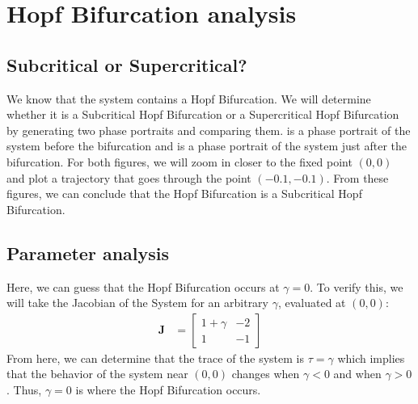 \section{Hopf Bifurcation analysis}\label{sec:hopf-bifurcation-analysis}

\subsection{Subcritical or Supercritical?}\label{subsec:subcritical-or-supercritical?}
We know that the system contains a Hopf Bifurcation. We will determine whether it is a Subcritical Hopf Bifurcation or a Supercritical Hopf Bifurcation by generating two phase portraits and comparing them.  is a phase portrait of the system before the bifurcation and  is a phase portrait of the system just after the bifurcation. For both figures, we will zoom in closer to the fixed point $(0,0)$ and plot a trajectory that goes through the point $(-0.1,-0.1)$. From these figures, we can conclude that the Hopf Bifurcation is a Subcritical Hopf Bifurcation.

\subsection{Parameter analysis}\label{subsec:parameter-analysis}
Here, we can guess that the Hopf Bifurcation occurs at $\gamma=0$. To verify this, we will take the Jacobian of the System for an arbitrary $\gamma$, evaluated at $(0,0)$:
\begin{align*}
    \textbf{J} &= \begin{bmatrix}
        1+\gamma & -2\\
        1 & -1
    \end{bmatrix}
\end{align*}
From here, we can determine that the trace of the system is $\tau=\gamma$ which implies that the behavior of the system near $(0,0)$ changes when $\gamma<0$ and when $\gamma>0$. Thus, $\gamma=0$ is where the Hopf Bifurcation occurs.
